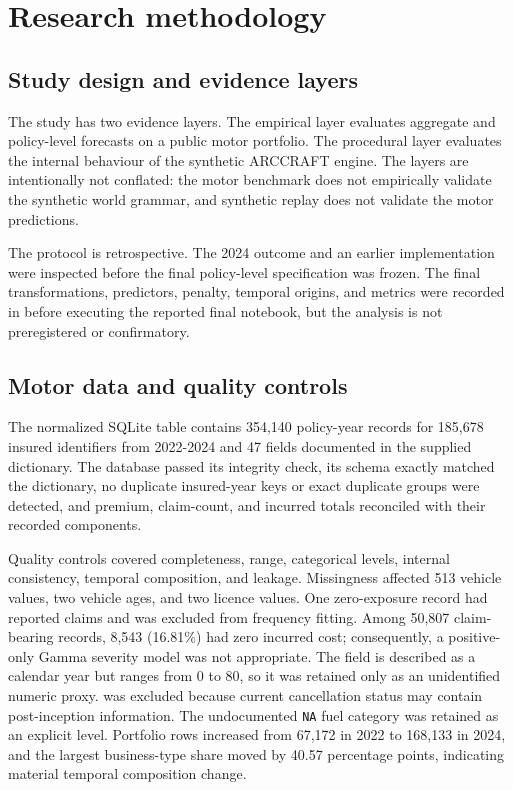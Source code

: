 \section{Research methodology}\label{sec:research-methodology}

\subsection{Study design and evidence layers}\label{sec:study-design-and-evidence-layers}

The study has two evidence layers. The empirical layer evaluates aggregate and policy-level forecasts on a public motor portfolio. The procedural layer evaluates the internal behaviour of the synthetic ARCCRAFT engine. The layers are intentionally not conflated: the motor benchmark does not empirically validate the synthetic world grammar, and synthetic replay does not validate the motor predictions.

The protocol is retrospective. The 2024 outcome and an earlier implementation were inspected before the final policy-level specification was frozen. The final transformations, predictors, penalty, temporal origins, and metrics were recorded in  before executing the reported final notebook, but the analysis is not preregistered or confirmatory.

\subsection{Motor data and quality controls}\label{sec:motor-data-and-quality-controls}

The normalized SQLite table contains 354,140 policy-year records for 185,678 insured identifiers from 2022-2024 and 47 fields documented in the supplied dictionary. The database passed its integrity check, its schema exactly matched the dictionary, no duplicate insured-year keys or exact duplicate groups were detected, and premium, claim-count, and incurred totals reconciled with their recorded components.

Quality controls covered completeness, range, categorical levels, internal consistency, temporal composition, and leakage. Missingness affected 513 vehicle values, two vehicle ages, and two licence values. One zero-exposure record had reported claims and was excluded from frequency fitting. Among 50,807 claim-bearing records, 8,543 (16.81\%) had zero incurred cost; consequently, a positive-only Gamma severity model was not appropriate. The field  is described as a calendar year but ranges from 0 to 80, so it was retained only as an unidentified numeric proxy.  was excluded because current cancellation status may contain post-inception information. The undocumented \texttt{NA} fuel category was retained as an explicit level. Portfolio rows increased from 67,172 in 2022 to 168,133 in 2024, and the largest business-type share moved by 40.57 percentage points, indicating material temporal composition change.

